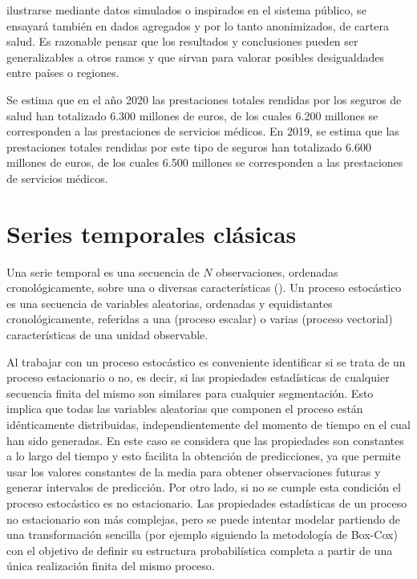 \documentclass[12pt,twoside]{article} %
\begin{document}
ilustrarse mediante datos simulados o inspirados en el sistema público, se ensayará también en dados agregados y por lo tanto anonimizados, de cartera salud. Es razonable pensar que los resultados y conclusiones pueden ser generalizables a otros ramos y que sirvan para valorar posibles desigualdades entre países o regiones. 

Se estima que en el año 2020 las prestaciones totales rendidas por los seguros de salud han totalizado 6.300 millones de euros, de los cuales 6.200 millones se corresponden a las prestaciones de servicios médicos. En 2019, se estima que las prestaciones totales rendidas por este tipo de seguros han totalizado 6.600 millones de euros, de los cuales 6.500 millones se corresponden a las prestaciones de servicios médicos.

\section{Series temporales clásicas}
Una serie temporal es una secuencia de $N$ observaciones, ordenadas cronológicamente, sobre una o diversas características (\cite{Pena2005}). Un proceso estocástico es una secuencia de variables aleatorias, ordenadas y equidistantes cronológicamente, referidas a una (proceso escalar) o varias (proceso vectorial) características de una unidad observable.

Al trabajar con un proceso estocástico es conveniente identificar si se trata de un proceso estacionario o no, es decir, si las propiedades estadísticas de cualquier secuencia finita del mismo son similares para cualquier segmentación. Esto implica que todas las variables aleatorias que componen el proceso están idénticamente distribuidas, independientemente del momento de tiempo en el cual han sido generadas. En este caso se considera que las propiedades son constantes a lo largo del tiempo y esto facilita la obtención de predicciones, ya que permite usar los valores constantes de la media para obtener observaciones futuras y generar intervalos de predicción. Por otro lado, si no se cumple esta condición el proceso estocástico es no estacionario. Las propiedades estadísticas de un proceso no estacionario son más complejas, pero se puede intentar modelar partiendo de una transformación sencilla (por ejemplo siguiendo la metodología de Box-Cox) con el objetivo de definir su estructura probabilística completa a partir de una única realización finita del mismo proceso.
\end{document}
